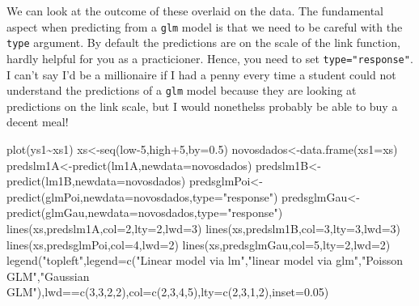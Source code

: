 \documentclass[
]{book}
\newenvironment{Shaded}{\begin{snugshade}}{\end{snugshade}}
\newcommand{\AttributeTok}[1]{\textcolor[rgb]{0.77,0.63,0.00}{#1}}
\newcommand{\DecValTok}[1]{\textcolor[rgb]{0.00,0.00,0.81}{#1}}
\newcommand{\FloatTok}[1]{\textcolor[rgb]{0.00,0.00,0.81}{#1}}
\newcommand{\FunctionTok}[1]{\textcolor[rgb]{0.00,0.00,0.00}{#1}}
\newcommand{\NormalTok}[1]{#1}
\newcommand{\OtherTok}[1]{\textcolor[rgb]{0.56,0.35,0.01}{#1}}
\newcommand{\SpecialCharTok}[1]{\textcolor[rgb]{0.00,0.00,0.00}{#1}}
\newcommand{\StringTok}[1]{\textcolor[rgb]{0.31,0.60,0.02}{#1}}
\begin{document}
We can look at the outcome of these overlaid on the data. The fundamental aspect when predicting from a \texttt{glm} model is that we need to be careful with the \texttt{type} argument. By default the predictions are on the scale of the link function, hardly helpful for you as a practicioner. Hence, you need to set \texttt{type="response"}. I can't say I'd be a millionaire if I had a penny every time a student could not understand the predictions of a \texttt{glm} model because they are looking at predictions on the link scale, but I would nonethelss probably be able to buy a decent meal!

\begin{Shaded}
\begin{Highlighting}[]
\FunctionTok{plot}\NormalTok{(ys1}\SpecialCharTok{\textasciitilde{}}\NormalTok{xs1)}
\NormalTok{xs}\OtherTok{\textless{}{-}}\FunctionTok{seq}\NormalTok{(low}\DecValTok{{-}5}\NormalTok{,high}\SpecialCharTok{+}\DecValTok{5}\NormalTok{,}\AttributeTok{by=}\FloatTok{0.5}\NormalTok{)}
\NormalTok{novosdados}\OtherTok{\textless{}{-}}\FunctionTok{data.frame}\NormalTok{(}\AttributeTok{xs1=}\NormalTok{xs)}
\NormalTok{predslm1A}\OtherTok{\textless{}{-}}\FunctionTok{predict}\NormalTok{(lm1A,}\AttributeTok{newdata=}\NormalTok{novosdados)}
\NormalTok{predslm1B}\OtherTok{\textless{}{-}}\FunctionTok{predict}\NormalTok{(lm1B,}\AttributeTok{newdata=}\NormalTok{novosdados)}
\NormalTok{predsglmPoi}\OtherTok{\textless{}{-}}\FunctionTok{predict}\NormalTok{(glmPoi,}\AttributeTok{newdata=}\NormalTok{novosdados,}\AttributeTok{type=}\StringTok{"response"}\NormalTok{)}
\NormalTok{predsglmGau}\OtherTok{\textless{}{-}}\FunctionTok{predict}\NormalTok{(glmGau,}\AttributeTok{newdata=}\NormalTok{novosdados,}\AttributeTok{type=}\StringTok{"response"}\NormalTok{)}
\FunctionTok{lines}\NormalTok{(xs,predslm1A,}\AttributeTok{col=}\DecValTok{2}\NormalTok{,}\AttributeTok{lty=}\DecValTok{2}\NormalTok{,}\AttributeTok{lwd=}\DecValTok{3}\NormalTok{)}
\FunctionTok{lines}\NormalTok{(xs,predslm1B,}\AttributeTok{col=}\DecValTok{3}\NormalTok{,}\AttributeTok{lty=}\DecValTok{3}\NormalTok{,}\AttributeTok{lwd=}\DecValTok{3}\NormalTok{)}
\FunctionTok{lines}\NormalTok{(xs,predsglmPoi,}\AttributeTok{col=}\DecValTok{4}\NormalTok{,}\AttributeTok{lwd=}\DecValTok{2}\NormalTok{)}
\FunctionTok{lines}\NormalTok{(xs,predsglmGau,}\AttributeTok{col=}\DecValTok{5}\NormalTok{,}\AttributeTok{lty=}\DecValTok{2}\NormalTok{,}\AttributeTok{lwd=}\DecValTok{2}\NormalTok{)}
\FunctionTok{legend}\NormalTok{(}\StringTok{"topleft"}\NormalTok{,}\AttributeTok{legend=}\FunctionTok{c}\NormalTok{(}\StringTok{"Linear model via lm"}\NormalTok{,}\StringTok{"linear model via glm"}\NormalTok{,}\StringTok{"Poisson GLM"}\NormalTok{,}\StringTok{"Gaussian GLM"}\NormalTok{),lwd}\SpecialCharTok{==}\FunctionTok{c}\NormalTok{(}\DecValTok{3}\NormalTok{,}\DecValTok{3}\NormalTok{,}\DecValTok{2}\NormalTok{,}\DecValTok{2}\NormalTok{),}\AttributeTok{col=}\FunctionTok{c}\NormalTok{(}\DecValTok{2}\NormalTok{,}\DecValTok{3}\NormalTok{,}\DecValTok{4}\NormalTok{,}\DecValTok{5}\NormalTok{),}\AttributeTok{lty=}\FunctionTok{c}\NormalTok{(}\DecValTok{2}\NormalTok{,}\DecValTok{3}\NormalTok{,}\DecValTok{1}\NormalTok{,}\DecValTok{2}\NormalTok{),}\AttributeTok{inset=}\FloatTok{0.05}\NormalTok{)}

\end{Highlighting}
\end{Shaded}
\end{document}

